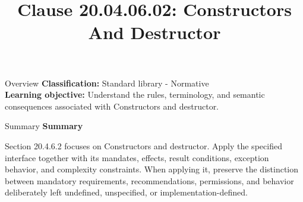 \documentclass[10pt,letterpaper]{article}
\title{Clause 20.04.06.02: Constructors And Destructor}
\author{}
\date{}
\begin{document}
\maketitle
\begin{CornellOverviewBox}{Overview}
\textbf{Classification:} Standard library - Normative\\[2pt]
\textbf{Learning objective:} Understand the rules, terminology, and semantic consequences associated with Constructors and destructor.
\end{CornellOverviewBox}\begin{CornellSummaryBox}{Summary}
{\sffamily\bfseries\color{Accent} Summary}\par\vspace{3pt}Section 20.4.6.2 focuses on Constructors and destructor. Apply the specified interface together with its mandates, effects, result conditions, exception behavior, and complexity constraints. When applying it, preserve the distinction between mandatory requirements, recommendations, permissions, and behavior deliberately left undefined, unspecified, or implementation-defined.
\end{CornellSummaryBox}
\end{document}
